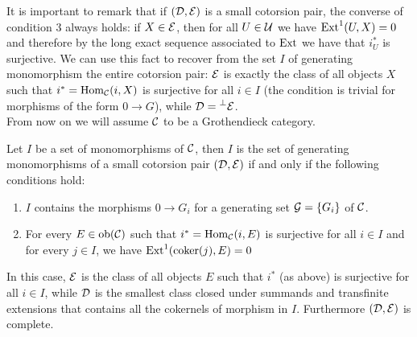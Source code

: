 It is important to remark that if $(\mathcal{D}, \mathcal{E})$ is a small cotorsion pair, the converse of condition $3$ always holds: if $X \in \mathcal{E}$, then for all $U\in \mathcal{U}$ we have $\mathrm{Ext}^1(U, X) = 0$ and therefore by the long exact sequence associated to $\mathrm{Ext}$ we have that $i_U^*$ is surjective. We can use this fact to recover from the set $I$ of generating monomorphism the entire cotorsion pair: $\mathcal{E}$ is exactly the class of all objects $X$ such that $i^* = \mathrm{Hom}_{\mathcal{C}} (i, X)$ is surjective for all $i\in I$ (the condition is trivial for morphisms of the form $0 \longrightarrow G$), while $\mathcal{D} = \prescript{\perp}{}{\mathcal{E}}$. \\
From now on we will assume $\mathcal{C}$ to be a Grothendieck category.

\begin{theorem}
	Let $I$ be a set of monomorphisms of $\mathcal{C}$, then $I$ is the set of generating monomorphisms of a small cotorsion pair $(\mathcal{D}, \mathcal{E})$ if and only if the following conditions hold:
	\begin{enumerate}
		\itemsep0em 
		\item $I$ contains the morphisms $0 \longrightarrow G_i$ for a generating set $\mathcal{G} = \{G_i\}$ of $\mathcal{C}$.
		\item For every $E \in \mathrm{ob}(\mathcal{C})$ such that $i^*= \mathrm{Hom}_{\mathcal{C}}(i, E)$ is surjective for all $i\in I$ and for every $j \in I$, we have $\mathrm{Ext}^1(\operatorname{coker}(j), E) = 0$  
	\end{enumerate}
	In this case, $\mathcal{E}$ is the class of all objects $E$ such that $i^*$ (as above) is surjective for all $i \in I$, while $\mathcal{D}$ is the smallest class closed under summands and transfinite extensions that contains all the cokernels of morphism in $I$. Furthermore $(\mathcal{D}, \mathcal{E})$ is complete.
\end{theorem}

